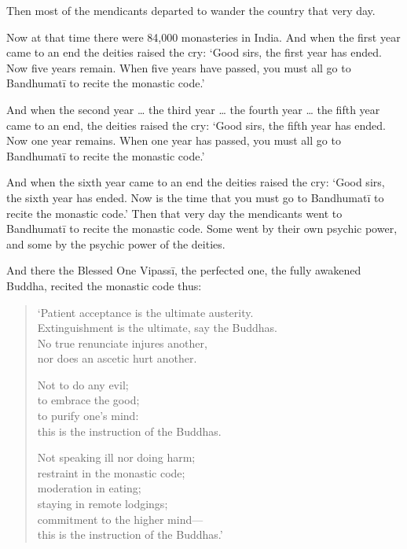 \documentclass[12pt,openany]{book}%
\begin{document}
Then most of the mendicants departed to wander the country that very day. 

Now at that time there were 84,000 monasteries in India. And when the first year came to an end the deities raised the cry: ‘Good sirs, the first year has ended. Now five years remain. When five years have passed, you must all go to \textsanskrit{Bandhumatī} to recite the monastic code.’ 

And when the second year … the third year … the fourth year … the fifth year came to an end, the deities raised the cry: ‘Good sirs, the fifth year has ended. Now one year remains. When one year has passed, you must all go to \textsanskrit{Bandhumatī} to recite the monastic code.’ 

And when the sixth year came to an end the deities raised the cry: ‘Good sirs, the sixth year has ended. Now is the time that you must go to \textsanskrit{Bandhumatī} to recite the monastic code.’ Then that very day the mendicants went to \textsanskrit{Bandhumatī} to recite the monastic code. Some went by their own psychic power, and some by the psychic power of the deities. 

And there the Blessed One \textsanskrit{Vipassī}, the perfected one, the fully awakened Buddha, recited the monastic code thus: 

\begin{verse}%
‘Patient acceptance is the ultimate austerity. \\
Extinguishment is the ultimate, say the Buddhas. \\
No true renunciate injures another, \\
nor does an ascetic hurt another. 

Not to do any evil; \\
to embrace the good; \\
to purify one’s mind: \\
this is the instruction of the Buddhas. 

Not speaking ill nor doing harm; \\
restraint in the monastic code; \\
moderation in eating; \\
staying in remote lodgings; \\
commitment to the higher mind—\\
this is the instruction of the Buddhas.’ 

%
\end{verse}
\end{document}
